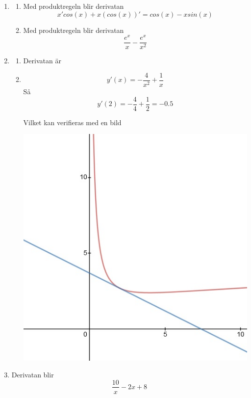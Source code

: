 \documentclass[a4paper,12pt]{article}
\begin{document}
\begin{enumerate}
    \item \begin{enumerate}
        \item Med produktregeln blir derivatan
        $$x'cos(x)+x(cos(x))'=cos(x)-xsin(x)$$

        \item Med produktregeln blir derivatan
        $$\frac{e^x}{x}-\frac{e^x}{x^2}$$
    \end{enumerate}

    \item \begin{enumerate}
        \item Derivatan är 

        \item $$y'(x)=-\frac{4}{x^2}+\frac{1}{x}$$
        Så 
        $$y'(2)=-\frac{4}{4}+\frac{1}{2}=-0.5$$

        Vilket kan verifieras med en bild

        \begin{center}
            \includegraphics[scale=0.5]{Figur 1.jpg}
        \end{center}
    \end{enumerate}

    \item
    Derivatan blir
    $$\frac{10}{x}-2x+8$$


\end{enumerate}
\end{document}
